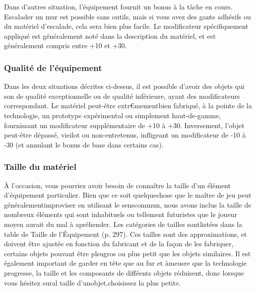Dans d'autres situation, l'équipement fournit un bonus à la tâche en cours. Escalader un mur est possible sans outils, mais si vous avez des gants adhésifs ou du matériel d'escalade, cela sera bien plus facile. Le modificateur spécifiquement appliqué est généralement noté dans la description du matériel, et est généralement compris entre +10 et +30. 

\subsubsection{Qualité de l'équipement} 

Dans les deux situations décrites ci-dessus, il est possible d'avoir des objets qui son de qualité exceptionnelle ou de qualité inférieure, ayant des modificateurs correspondant. Le matériel peut-être extr€mementbien fabriqué, à la pointe de la technologie, un prototype expérimental ou simplement haut-de-gamme, fournissant un modificateur supplémentaire de +10 à +30. Inversement, l'objet peut-être dépassé, vieilot ou non-entretenus, infligeant un modificateur de -10 à -30 (et annulant le bonus de base dans certains cas). 

\subsubsection{Taille du matériel} 

À l'occasion, vous pourriez avoir besoin de connaître la taille d'un élément d'équipement particulier. Bien que ce soit quelquechose que le maître de jeu peut généralementimproviser en utilisant le senscommun, nous avons inclus la taille de nombreux éléments qui sont inhabituels ou tellement futuristes que le joueur moyen aurait du mal à apréhender. Les catégories de tailles sontlistées dans la table de Taille de l'Équipement (p. 297). Ces tailles sont des approximations, et doivent être ajustée en fonction du fabricant et de la façon de les fabriquer, certains objets pouvant être plsugros ou plus petit que les objets similaires. Il est également important de garder en tête que au fur et àmeusre que la technologie progresse, la taille et les composants de difféents objets réduisent, donc lorsque vous hésitez sural taille d'unobjet,choisissez la plus petite. 



